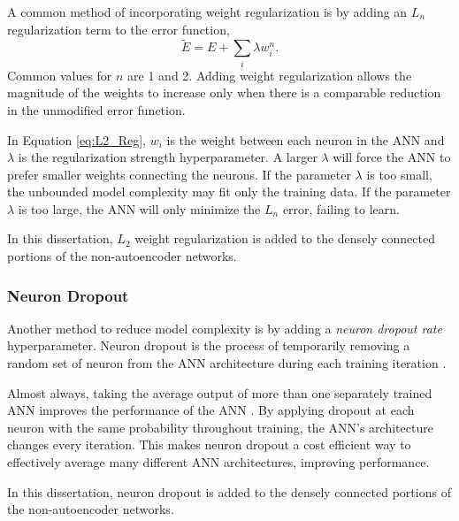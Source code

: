 A common method of incorporating weight regularization is by adding an $L_n$ regularization term to the error function, 
%
\begin{equation} \label{eq:L2_Reg}
\tilde{E} = E + \sum_i \lambda w_i^n.
\end{equation}
%
Common values for $n$ are 1 and 2. Adding weight regularization allows the magnitude of the weights to increase only when there is a comparable reduction in the unmodified error function.

In Equation \ref{eq:L2_Reg}, $w_i$ is the weight between each neuron in the ANN and $\lambda$ is the regularization strength hyperparameter. A larger $\lambda$ will force the ANN to prefer smaller weights connecting the neurons. If the parameter $\lambda$ is too small, the unbounded model complexity may fit only the training data. If the parameter $\lambda$ is too large, the ANN will only minimize the $L_n$ error, failing to learn.

In this dissertation, $L_2$ weight regularization is added to the densely connected portions of the non-autoencoder networks.

\subsubsection{Neuron Dropout}

Another method to reduce model complexity is by adding a \textit{neuron dropout rate} hyperparameter. Neuron dropout is the process of temporarily removing a random set of neuron from the ANN architecture during each training iteration \cite{Srivastava2014}.

Almost always, taking the average output of more than one separately trained ANN improves the performance of the ANN \cite{Srivastava2014}. By applying dropout at each neuron with the same probability throughout training, the ANN's architecture changes every iteration. This makes neuron dropout a cost efficient way to effectively average many different ANN architectures, improving performance. 


In this dissertation, neuron dropout is added to the densely connected portions of the non-autoencoder networks.


